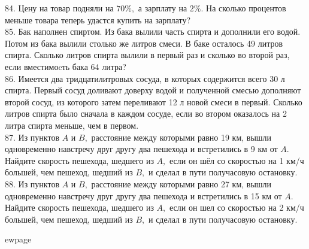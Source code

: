 84. Цену на товар подняли на $70\%,$ а зарплату на $2\%.$ На сколько процентов меньше товара теперь удастся купить на зарплату?\\
85. Бак наполнен спиртом. Из бака вылили часть спирта и
дополнили его водой. Потом из бака вылили столько же
литров смеси. В баке осталось 49 литров спирта. Сколько
литров спирта вылили в первый раз и сколько во второй
раз, если вместимоcть бака 64 литра?\\
86. Имеется два тридцатилитровых сосуда, в которых
содержится всего 30 л спирта. Первый сосуд доливают
доверху водой и полученной смесью дополняют второй
сосуд, из которого затем переливают 12 л новой смеси в
первый. Сколько литров спирта было сначала в каждом
сосуде, если во втором оказалось на 2 литра спирта
меньше, чем в первом.\\
87. Из пунктов $A$ и $B,$ расстояние между которыми равно 19
км, вышли одновременно навстречу друг другу два
пешехода и встретились в 9 км от $A.$ Найдите скорость
пешехода, шедшего из $A,$ если он шёл со скоростью на
1 км/ч большей, чем пешеход, шедший из $B,$ и сделал в
пути получасовую остановку.\\
88. Из пунктов $A$ и $B,$ расстояние между которыми равно 27
км, вышли одновременно навстречу друг другу два
пешехода и встретились в 15 км от $A.$ Найдите скорость
пешехода, шедшего из $A,$ если он шел со скоростью на
2 км/ч большей, чем пешеход, шедший из $B,$ и сделал в
пути получасовую остановку.

ewpage
